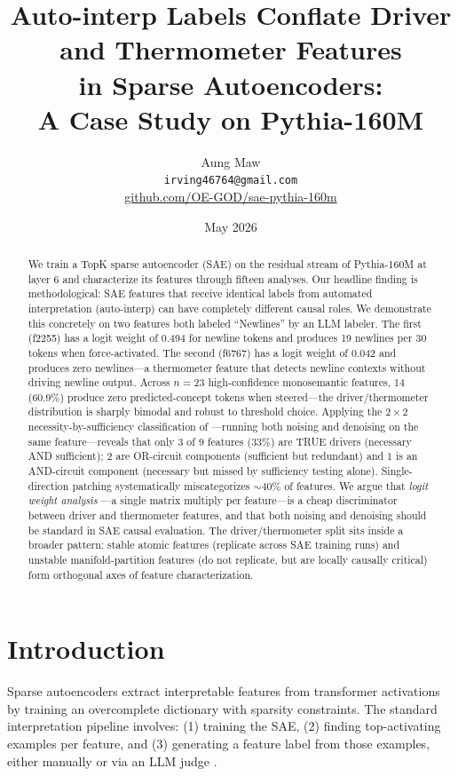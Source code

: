 \documentclass[11pt]{article}
\title{Auto-interp Labels Conflate Driver and Thermometer Features\\
       in Sparse Autoencoders:\\
       A Case Study on Pythia-160M}
\author{
  Aung Maw\\
  \texttt{irving46764@gmail.com}\\
  \href{https://github.com/OE-GOD/sae-pythia-160m}{github.com/OE-GOD/sae-pythia-160m}
}
\date{May 2026}
\begin{document}
\maketitle

\begin{abstract}
We train a TopK sparse autoencoder (SAE) on the residual stream of Pythia-160M
at layer 6 and characterize its features through fifteen analyses. Our headline
finding is methodological: SAE features that receive identical labels from
automated interpretation (auto-interp) can have completely different causal roles.
We demonstrate this concretely on two features both labeled ``Newlines'' by an LLM
labeler. The first (f2255) has a logit weight of 0.494 for newline tokens and
produces 19 newlines per 30 tokens when force-activated. The second (f6767) has a
logit weight of 0.042 and produces zero newlines---a thermometer feature that
detects newline contexts without driving newline output. Across $n{=}23$
high-confidence monosemantic features, $14$ (60.9\%) produce zero predicted-concept
tokens when steered---the driver/thermometer distribution is sharply bimodal and
robust to threshold choice. Applying the $2 \times 2$ necessity-by-sufficiency
classification of \citep{heimersheim2024howto}---running both noising and
denoising on the same feature---reveals that only $3$ of $9$ features ($33\%$)
are TRUE drivers (necessary AND sufficient); $2$ are OR-circuit components
(sufficient but redundant) and $1$ is an AND-circuit component (necessary but
missed by sufficiency testing alone). Single-direction patching systematically
miscategorizes $\sim 40\%$ of features. We argue that \emph{logit weight analysis}
---a single matrix multiply per feature---is a cheap discriminator between
driver and thermometer features, and that both noising and denoising should be
standard in SAE causal evaluation. The driver/thermometer split sits inside a
broader pattern: stable atomic features (replicate across SAE training runs) and
unstable manifold-partition features (do not replicate, but are locally causally
critical) form orthogonal axes of feature characterization.
\end{abstract}

\section{Introduction}

Sparse autoencoders \citep{bricken2023monosemanticity} extract interpretable features
from transformer activations by training an overcomplete dictionary with sparsity
constraints. The standard interpretation pipeline involves: (1) training the SAE,
(2) finding top-activating examples per feature, and (3) generating a feature
label from those examples, either manually or via an LLM judge
\citep{bills2023language}.
\end{document}
